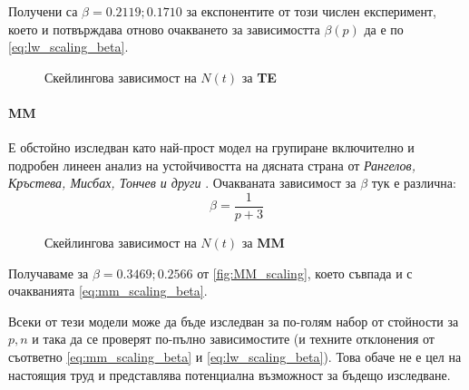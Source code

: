 Получени са $\beta = 0.2119; 0.1710$ за експонентите от този числен експеримент, което и потвърждава отново очакването за зависимостта $\beta(p)$ да е по \autoref{eq:lw_scaling_beta}.
\begin{figure}[hbpt]
    \centering
    \caption{Скейлингова зависимост на $N(t)$ за \textbf{TE}}
    \label{fig:TE_scaling}
\end{figure}

\paragraph{MM} Е обстойно изследван като най-прост модел на групиране включително и подробен линеен анализ на устойчивостта на дясната страна  от \textit{Рангелов, Кръстева, Мисбах, Тончев и други} \cite{Ranguelov2012}. Очакваната зависимост за $\beta$ тук е различна:
\begin{equation}
    \beta = \frac{1}{p+3}
    \label{eq:mm_scaling_beta}
\end{equation} 
\begin{figure}[hbpt]
    \centering
    \caption{Скейлингова зависимост на $N(t)$ за \textbf{MM}}
    \label{fig:MM_scaling}
\end{figure}

Получаваме за $\beta = 0.3469; 0.2566$ от \autoref{fig:MM_scaling}, което съвпада и с очакванията \autoref{eq:mm_scaling_beta}.

Всеки от тези модели може да бъде изследван за по-голям набор от стойности за $p, n$ и така да се проверят по-пълно зависимостите (и техните отклонения от съответно \autoref{eq:mm_scaling_beta} и \autoref{eq:lw_scaling_beta}). Това обаче не е цел на настоящия труд и представлява потенциална възможност за бъдещо изследване.


